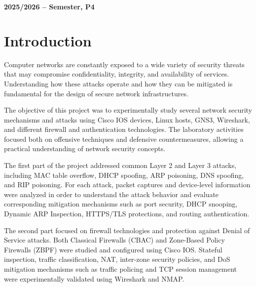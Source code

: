 \documentclass[12pt]{article}
\begin{document}
\begin{center}
    \large \bf 2025/2026 --  Semester, P4
\end{center}

\thispagestyle{empty}

\setcounter{page}{0}

\newpage

\tableofcontents 

\newpage


\section{Introduction}

Computer networks are constantly exposed to a wide variety of security threats that may compromise confidentiality, integrity, and availability of services. Understanding how these attacks operate and how they can be mitigated is fundamental for the design of secure network infrastructures.

The objective of this project was to experimentally study several network security mechanisms and attacks using Cisco IOS devices, Linux hosts, GNS3, Wireshark, and different firewall and authentication technologies. The laboratory activities focused both on offensive techniques and defensive countermeasures, allowing a practical understanding of network security concepts.

The first part of the project addressed common Layer 2 and Layer 3 attacks, including MAC table overflow, DHCP spoofing, ARP poisoning, DNS spoofing, and RIP poisoning. For each attack, packet captures and device-level information were analyzed in order to understand the attack behavior and evaluate corresponding mitigation mechanisms such as port security, DHCP snooping, Dynamic ARP Inspection, HTTPS/TLS protections, and routing authentication.

The second part focused on firewall technologies and protection against Denial of Service attacks. Both Classical Firewalls (CBAC) and Zone-Based Policy Firewalls (ZBPF) were studied and configured using Cisco IOS. Stateful inspection, traffic classification, NAT, inter-zone security policies, and DoS mitigation mechanisms such as traffic policing and TCP session management were experimentally validated using Wireshark and NMAP.
\end{document}
